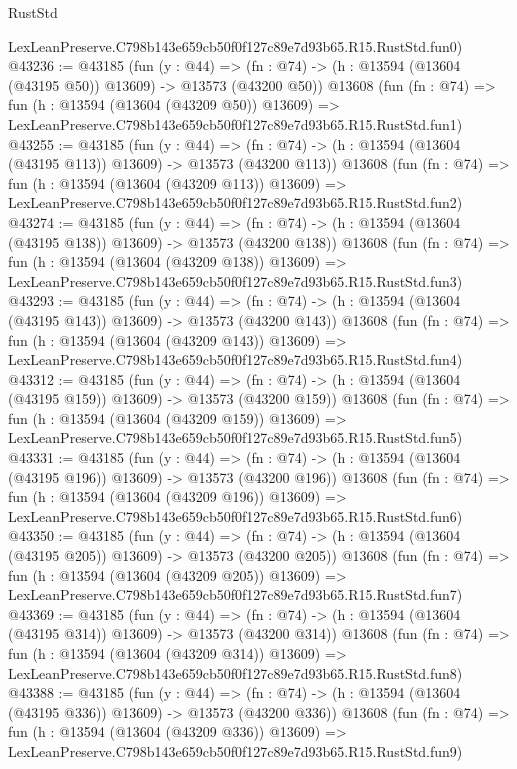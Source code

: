 \begin{lexlean}{RustStd}
\begin{coremodule}
    LexLeanPreserve.C798b143e659cb50f0f127c89e7d93b65.R15.RustStd.fun0)
@43236 := @43185
    (fun (y : @44) =>
    (fn : @74) -> (h : @13594 (@13604 (@43195 @50)) @13609) -> @13573 (@43200 @50))
    @13608
    (fun (fn : @74) =>
    fun (h : @13594 (@13604 (@43209 @50)) @13609) =>
    LexLeanPreserve.C798b143e659cb50f0f127c89e7d93b65.R15.RustStd.fun1)
@43255 := @43185
    (fun (y : @44) =>
    (fn : @74) -> (h : @13594 (@13604 (@43195 @113)) @13609) -> @13573 (@43200 @113))
    @13608
    (fun (fn : @74) =>
    fun (h : @13594 (@13604 (@43209 @113)) @13609) =>
    LexLeanPreserve.C798b143e659cb50f0f127c89e7d93b65.R15.RustStd.fun2)
@43274 := @43185
    (fun (y : @44) =>
    (fn : @74) -> (h : @13594 (@13604 (@43195 @138)) @13609) -> @13573 (@43200 @138))
    @13608
    (fun (fn : @74) =>
    fun (h : @13594 (@13604 (@43209 @138)) @13609) =>
    LexLeanPreserve.C798b143e659cb50f0f127c89e7d93b65.R15.RustStd.fun3)
@43293 := @43185
    (fun (y : @44) =>
    (fn : @74) -> (h : @13594 (@13604 (@43195 @143)) @13609) -> @13573 (@43200 @143))
    @13608
    (fun (fn : @74) =>
    fun (h : @13594 (@13604 (@43209 @143)) @13609) =>
    LexLeanPreserve.C798b143e659cb50f0f127c89e7d93b65.R15.RustStd.fun4)
@43312 := @43185
    (fun (y : @44) =>
    (fn : @74) -> (h : @13594 (@13604 (@43195 @159)) @13609) -> @13573 (@43200 @159))
    @13608
    (fun (fn : @74) =>
    fun (h : @13594 (@13604 (@43209 @159)) @13609) =>
    LexLeanPreserve.C798b143e659cb50f0f127c89e7d93b65.R15.RustStd.fun5)
@43331 := @43185
    (fun (y : @44) =>
    (fn : @74) -> (h : @13594 (@13604 (@43195 @196)) @13609) -> @13573 (@43200 @196))
    @13608
    (fun (fn : @74) =>
    fun (h : @13594 (@13604 (@43209 @196)) @13609) =>
    LexLeanPreserve.C798b143e659cb50f0f127c89e7d93b65.R15.RustStd.fun6)
@43350 := @43185
    (fun (y : @44) =>
    (fn : @74) -> (h : @13594 (@13604 (@43195 @205)) @13609) -> @13573 (@43200 @205))
    @13608
    (fun (fn : @74) =>
    fun (h : @13594 (@13604 (@43209 @205)) @13609) =>
    LexLeanPreserve.C798b143e659cb50f0f127c89e7d93b65.R15.RustStd.fun7)
@43369 := @43185
    (fun (y : @44) =>
    (fn : @74) -> (h : @13594 (@13604 (@43195 @314)) @13609) -> @13573 (@43200 @314))
    @13608
    (fun (fn : @74) =>
    fun (h : @13594 (@13604 (@43209 @314)) @13609) =>
    LexLeanPreserve.C798b143e659cb50f0f127c89e7d93b65.R15.RustStd.fun8)
@43388 := @43185
    (fun (y : @44) =>
    (fn : @74) -> (h : @13594 (@13604 (@43195 @336)) @13609) -> @13573 (@43200 @336))
    @13608
    (fun (fn : @74) =>
    fun (h : @13594 (@13604 (@43209 @336)) @13609) =>
    LexLeanPreserve.C798b143e659cb50f0f127c89e7d93b65.R15.RustStd.fun9)

\end{coremodule}
\end{lexlean}
